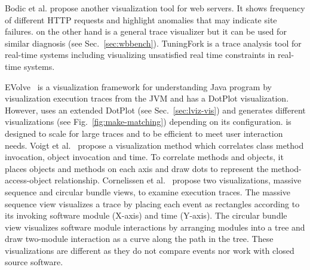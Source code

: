 Bodic et al. \cite{bodik2005combining} propose another visualization tool for
web servers.
It shows frequency of different HTTP requests
and highlight anomalies that may indicate site failures.
\VDP{} on the other hand is a general trace visualizer but
it can be used for similar diagnosis (see Sec.~\ref{sec:wbbench}).
TuningFork \cite{bacon2007tuningfork} is a trace analysis tool for real-time systems
including visualizing unsatisfied real time constraints in
real-time systems.

EVolve~\cite{wang2003evolve} is a visualization framework for understanding
Java program by visualization execution traces from the JVM and
has a DotPlot visualization.
However, \VDP{} uses an extended DotPlot (see Sec.~\ref{sec:lviz-vis})
and generates different visualizations (see Fig.~\ref{fig:make-matching})
depending on its configuration.
\lviz{} is designed to scale for large traces and
to be efficient to meet user interaction needs.
Voigt et al.~\cite{voigt2009object} propose a visualization method which correlates
class method invocation, object invocation and time.
To correlate methods and objects, it places objects and methods
on each axis and draw dots to represent the
method-access-object relationship.
Cornelissen et al.~\cite{cornelissen2007understanding} propose two visualizations,
massive sequence and circular bundle views, to examine execution traces.
The massive sequence view visualizes a trace by placing each event as rectangles
according to its invoking software module (X-axis) and time (Y-axis).
The circular bundle view visualizes software module interactions by arranging
modules into a tree and draw two-module interaction as a curve along the
path in the tree.
These visualizations are different as they do not compare events 
nor work with closed source software.

